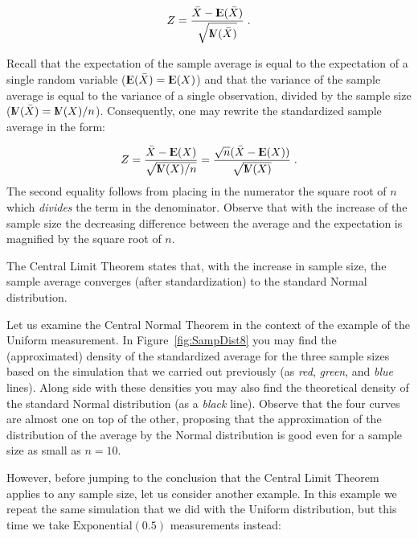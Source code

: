\documentclass[]{krantz}
\newcommand{\Expec}{{\rm I\kern-.3em E}}
\newcommand{\Var}{{\rm I\kern-.3em V}}
\theoremstyle{definition}
\theoremstyle{definition}
\theoremstyle{definition}
\theoremstyle{remark}
\begin{document}
\[Z = \frac{\bar X - \Expec(\bar X)}{\sqrt{\Var(\bar X)}}\;.\]

Recall that the expectation of the sample average is equal to the
expectation of a single random variable (\(\Expec(\bar X) = \Expec(X)\))
and that the variance of the sample average is equal to the variance of
a single observation, divided by the sample size
(\(\Var(\bar X) = \Var(X)/n\)). Consequently, one may rewrite the
standardized sample average in the form:

\[Z = \frac{\bar X - \Expec(X)}{\sqrt{\Var(X)/n}}= \frac{\sqrt{n}(\bar X - \Expec(X))}{\sqrt{\Var(X)}}\;.\]
The second equality follows from placing in the numerator the square
root of \(n\) which \emph{divides} the term in the denominator. Observe
that with the increase of the sample size the decreasing difference
between the average and the expectation is magnified by the square root
of \(n\).

The Central Limit Theorem states that, with the increase in sample size,
the sample average converges (after standardization) to the standard
Normal distribution.

Let us examine the Central Normal Theorem in the context of the example
of the Uniform measurement. In Figure~\ref{fig:SampDist8} you may find
the (approximated) density of the standardized average for the three
sample sizes based on the simulation that we carried out previously (as
\emph{red}, \emph{green}, and \emph{blue} lines). Along side with these
densities you may also find the theoretical density of the standard
Normal distribution (as a \emph{black} line). Observe that the four
curves are almost one on top of the other, proposing that the
approximation of the distribution of the average by the Normal
distribution is good even for a sample size as small as \(n=10\).

However, before jumping to the conclusion that the Central Limit Theorem
applies to any sample size, let us consider another example. In this
example we repeat the same simulation that we did with the Uniform
distribution, but this time we take \(\mathrm{Exponential}(0.5)\)
measurements instead:
\end{document}
